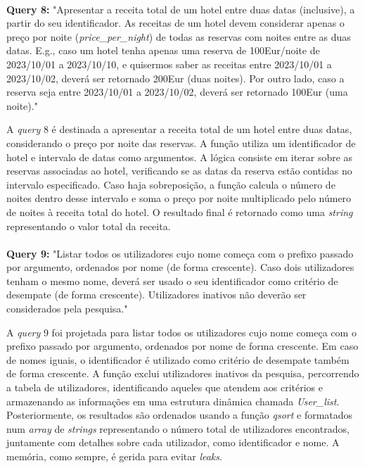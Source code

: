 \documentclass{article}
\begin{document}
\paragraph{}\textbf{Query 8:} "Apresentar a receita total de um hotel entre duas datas (inclusive), a partir do seu identificador. As receitas de um hotel devem considerar apenas o preço por noite (\textit{price\_per\_night}) de todas as reservas com noites entre as duas datas. E.g., caso um hotel tenha apenas uma reserva de 100Eur/noite de 2023/10/01 a 2023/10/10, e quisermos saber as receitas entre 2023/10/01 a 2023/10/02, deverá ser retornado 200Eur (duas noites). Por outro lado, caso a reserva seja entre 2023/10/01 a 2023/10/02,
deverá ser retornado 100Eur (uma noite)."

A \textit{query} 8 é destinada a apresentar a receita total de um hotel entre duas datas, considerando o preço por noite das reservas. A função utiliza um identificador de hotel e intervalo de datas como argumentos. A lógica consiste em iterar sobre as reservas associadas ao hotel, verificando se as datas da reserva estão contidas no intervalo especificado. Caso haja sobreposição, a função calcula o número de noites dentro desse intervalo e soma o preço por noite multiplicado pelo número de noites à receita total do hotel. O resultado final é retornado como uma \textit{string} representando o valor total da receita.

\paragraph{}\textbf{Query 9:} "Listar todos os utilizadores cujo nome começa com o prefixo passado por argumento, ordenados
por nome (de forma crescente). Caso dois utilizadores tenham o mesmo nome, deverá ser usado o seu identificador como critério de desempate (de forma crescente). Utilizadores inativos não deverão ser considerados pela pesquisa."

A \textit{query} 9 foi projetada para listar todos os utilizadores cujo nome começa com o prefixo passado por argumento, ordenados por nome de forma crescente. Em caso de nomes iguais, o identificador é utilizado como critério de desempate também de forma crescente. A função exclui utilizadores inativos da pesquisa, percorrendo a tabela de utilizadores, identificando aqueles que atendem aos critérios e armazenando as informações em uma estrutura dinâmica chamada \textit{User\_list}. Posteriormente, os resultados são ordenados usando a função \textit{qsort} e formatados num \textit{array} de \textit{strings} representando o número total de utilizadores encontrados, juntamente com detalhes sobre cada utilizador, como identificador e nome. A memória, como sempre, é gerida para evitar \textit{leaks}.
\end{document}
